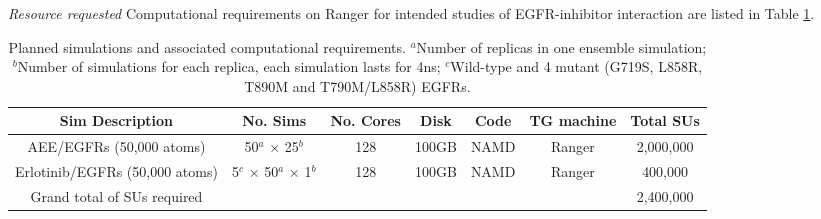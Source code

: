 \begin{compactenum}[a)]
\item \emph{Resource requested}
Computational requirements on Ranger for intended studies of EGFR-inhibitor interaction
are listed in Table \ref{t:efgr}.

\begin{table}[h]
\centering
\begin{tabular}[b]
{|>{\scriptsize}c|>{\scriptsize}c|>{\scriptsize}
c|>{\scriptsize}c|>{\scriptsize}c|>{\scriptsize}c|>{\scriptsize}c|}
\hline
\textbf{Sim Description} & \textbf{No. Sims} &
\textbf{No. Cores} & \textbf{Disk} &
\textbf{Code} & \textbf{TG machine} & \textbf{Total SUs}\\
\hline
AEE/EGFRs (50,000 atoms) & 50$^a$ $\times$ 25$^b$ & 128 & 100GB & NAMD & Ranger & 2,000,000\\
\hline
Erlotinib/EGFRs (50,000 atoms) & 5$^c$ $\times$ 50$^a$ $\times$ 1$^b$ & 128 & 100GB & NAMD & Ranger & 400,000\\
\hline
Grand total of SUs required & & & & & & 2,400,000 \\
\hline
\end{tabular} \caption{Planned simulations and associated computational requirements. $^a$Number of replicas in one ensemble simulation; $^b$Number of simulations for each replica, each simulation lasts for 4ns; $^c$Wild-type and 4 mutant (G719S, L858R, T890M and T790M/L858R) EGFRs.}
\label{t:efgr}
\end{table}
\end{compactenum}
